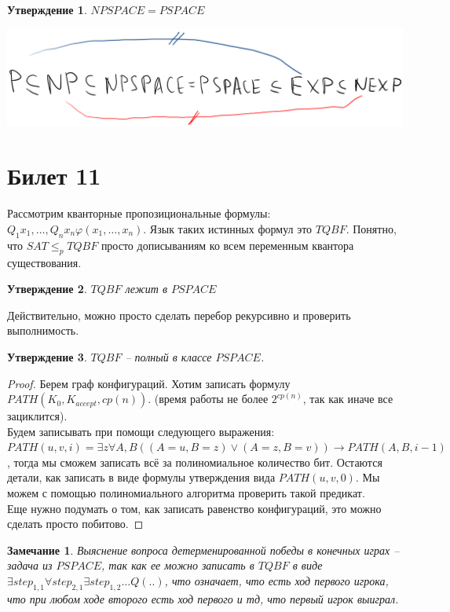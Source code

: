 \documentclass[12pt, letterpaper]{article}
\newtheorem{prop}{Утверждение}[section]
\newtheorem{note}{Замечание}[section]
\newcommand{\ph}{\varphi}
\newcommand{\leqp}{\leq_{p}}
\begin{document}
\begin{prop}
$NPSPACE = PSPACE$
\end{prop}
\includegraphics[scale=0.6]{hierarchy1.png}

\section{Билет 11}
Рассмотрим кванторные пропозициональные формулы: $Q_1 x_1, \ldots, Q_n x_n \ph(x_1, \ldots, x_n)$. Язык таких истинных формул это $TQBF$. Понятно, что $SAT \leqp TQBF$ просто дописываниям ко всем переменным квантора существования.\\
\begin{prop}
$TQBF$ лежит в $PSPACE$ 
\end{prop}
Действительно, можно просто сделать перебор рекурсивно и проверить выполнимость.

\begin{prop}
$TQBF$ -- полный в классе $PSPACE$.
\end{prop}
\begin{proof}
Берем граф конфигураций. Хотим записать формулу $PATH(K_0, K_{accept}, cp(n))$. (время работы не более $2^{cp(n)}$, так как иначе все зациклится).\\
Будем записывать при помощи следующего выражения: \\
$PATH(u, v, i) = \exists z \forall A, B ((A=u, B=z) \vee (A=z, B=v)) \rightarrow PATH(A, B, i-1)$, тогда мы сможем записать всё за полиномиальное количество бит. Остаются детали, как записать в виде формулы утверждения вида $PATH(u, v, 0)$. Мы можем с помощью полиномиального алгоритма проверить такой предикат. \\
Еще нужно подумать о том, как записать равенство конфигураций, это можно сделать просто побитово.
\end{proof}

\begin{note}
Выяснение вопроса детерменированной победы в конечных играх -- задача из $PSPACE$, так как ее можно записать в $TQBF$ в виде $\exists step_{1,1} \forall step_{2,1} \exists step_{1,2} \ldots Q(..)$, что означает, что есть ход первого игрока, что при любом ходе второго есть ход первого и тд, что первый игрок выиграл.
\end{note}
\end{document}
